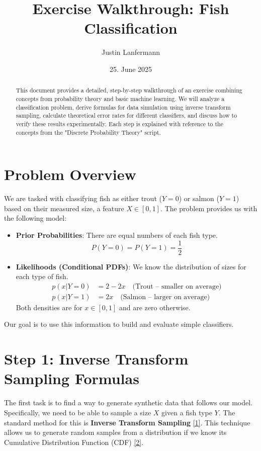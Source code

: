 \documentclass[11pt,a4paper]{article}
\title{Exercise Walkthrough: Fish Classification}
\author{Justin Lanfermann}
\date{25. June 2025}
\begin{document}
\maketitle

\begin{abstract}
    This document provides a detailed, step-by-step walkthrough of an exercise combining concepts from probability theory and basic machine learning. We will analyze a classification problem, derive formulas for data simulation using inverse transform sampling, calculate theoretical error rates for different classifiers, and discuss how to verify these results experimentally. Each step is explained with reference to the concepts from the "Discrete Probability Theory" script.
\end{abstract}

\section{Problem Overview}
We are tasked with classifying fish as either trout ($Y=0$) or salmon ($Y=1$) based on their measured size, a feature $X \in [0,1]$.
The problem provides us with the following model:
\begin{itemize}
    \item \textbf{Prior Probabilities}: There are equal numbers of each fish type.
    \[ P(Y=0) = P(Y=1) = \frac{1}{2} \]
    \item \textbf{Likelihoods (Conditional PDFs)}: We know the distribution of sizes for each type of fish.
    \begin{align*}
        p(x|Y=0) &= 2-2x \quad \text{(Trout -- smaller on average)} \\
        p(x|Y=1) &= 2x \quad \text{(Salmon -- larger on average)}
    \end{align*}
    Both densities are for $x \in [0,1]$ and are zero otherwise.
\end{itemize}
Our goal is to use this information to build and evaluate simple classifiers.

\section{Step 1: Inverse Transform Sampling Formulas}
\label{sec:its}

The first task is to find a way to generate synthetic data that follows our model. Specifically, we need to be able to sample a size $X$ given a fish type $Y$. The standard method for this is \textbf{Inverse Transform Sampling} \hyperlink{concept:its}{[1]}. This technique allows us to generate random samples from a distribution if we know its Cumulative Distribution Function (CDF) \hyperlink{concept:cdf}{[2]}.
\end{document}
